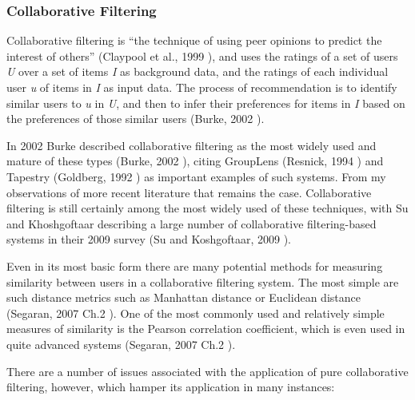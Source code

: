 \subsubsection{Collaborative Filtering}

Collaborative filtering is ``the technique of using peer opinions to predict the interest of others'' (Claypool et al., 1999 \cite{Claypool99}), and uses the ratings of a set of users \textit{U} over a set of items \textit{I} as background data, and the ratings of each individual user \textit{u} of items in \textit{I} as input data. The process of recommendation is to identify similar users to \textit{u} in \textit{U}, and then to infer their preferences for items in \textit{I} based on the preferences of those similar users (Burke, 2002 \cite{Burke02}).

In 2002 Burke described collaborative filtering as the most widely used and mature of these types (Burke, 2002 \cite{Burke02}), citing GroupLens (Resnick, 1994 \cite{Resnick94}) and Tapestry (Goldberg, 1992 \cite{Goldberg92}) as important examples of such systems. From my observations of more recent literature that remains the case. Collaborative filtering is still certainly among the most widely used of these techniques, with Su and Khoshgoftaar describing a large number of collaborative filtering-based systems in their 2009 survey (Su and Koshgoftaar, 2009 \cite{Su09}).

Even in its most basic form there are many potential methods for measuring similarity between users in a collaborative filtering system. The most simple are such distance metrics such as Manhattan distance or Euclidean distance (Segaran, 2007 Ch.2 \cite{Segaran07}). One of the most commonly used and relatively simple measures of similarity is the Pearson correlation coefficient, which is even used in quite advanced systems (Segaran, 2007 Ch.2 \cite{Segaran07}).

There are a number of issues associated with the application of pure collaborative filtering, however, which hamper its application in many instances:


